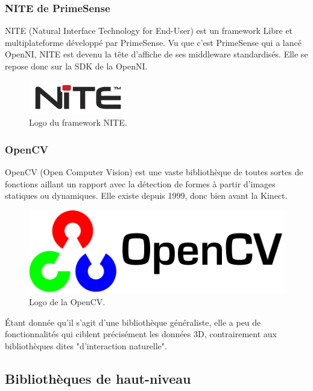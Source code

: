 \subsubsection{NITE de PrimeSense}
NITE (Natural Interface Technology for End-User) est un framework Libre et 
multiplateforme développé par PrimeSense. Vu que c'est PrimeSense qui a 
lancé OpenNI, NITE est devenu la tête d'affiche de ses
middleware standardisés. Elle se repose donc sur la SDK de la OpenNI. 
\begin{figure}[h!]
\centering
\includegraphics[width=0.3\linewidth]{images/nite_logo}
\caption{Logo du framework NITE.}
\end{figure}

\subsubsection{OpenCV}
OpenCV (Open Computer Vision) est une vaste bibliothèque de toutes sortes de 
fonctions aillant un rapport avec la détection de formes à partir d'images
statiques ou dynamiques. Elle existe depuis 1999, donc bien avant la Kinect.
\begin{figure}[h!]
\centering
\includegraphics[width=0.4\linewidth]{images/opencv_logo}
\caption{Logo de la OpenCV.}
\end{figure}
Étant donnée qu'il s'agit d'une bibliothèque généraliste, elle a peu de 
fonctionnalités qui ciblent précisément les données 3D, contrairement aux 
bibliothèques dites "d'interaction naturelle".


\subsection{Bibliothèques de haut-niveau}

